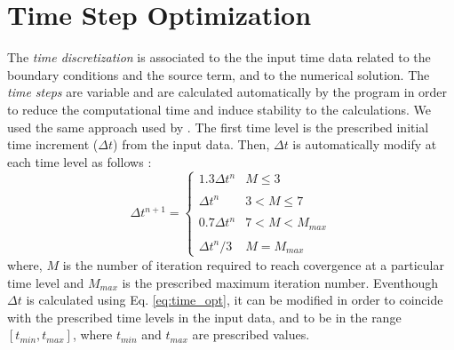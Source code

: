 \documentclass[a4paper,12pt]{article}
\begin{document}
\section{Time Step Optimization}
The \emph{time discretization} is associated to the the input time data related to the boundary conditions and the source term, and to the numerical solution. The \emph{time steps} are variable and are calculated automatically by the program in order to reduce the computational time and induce stability to the calculations.
We used the same approach used by \cite{Hydrus1d}. The first time level is the prescribed initial time increment ($\Delta t$) from the input data. Then, $\Delta t$ is automatically modify at each time level as follows \citep{Hydrus1d}:
\begin{equation} \label{eq:time_opt}
  \Delta t^{n+1}=%
  \begin{cases}
    1.3\Delta t^n & M\leq3 \\
    \\
    \Delta t^n & 3<M\leq7 \\
    \\
  	0.7\Delta t^n & 7<M<M_{max} \\
  	\\
  	\Delta t^n/3 & M=M_{max}
  \end{cases}
\end{equation}
where, $M$ is the number of iteration required to reach covergence at a particular time level and $M_{max}$ is the prescribed maximum iteration number. Eventhough $\Delta t$ is calculated using Eq. \ref{eq:time_opt}, it can be modified in order to coincide with the prescribed time levels in the input data, and to be in the range $[t_{min},t_{max}]$, where $t_{min}$ and $t_{max}$ are prescribed values.


\end{document}
